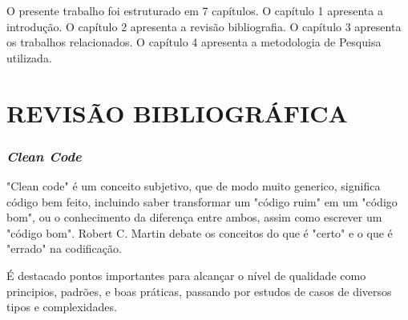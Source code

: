 \documentclass[12pt]{article}
\begin{document}
O presente trabalho foi estruturado em 7 capítulos.
O capítulo 1 apresenta a introdução.
O capítulo 2 apresenta a revisão bibliografia.
O capítulo 3 apresenta os trabalhos relacionados.
O capítulo 4 apresenta a metodologia de Pesquisa utilizada.



\part{REVISÃO BIBLIOGRÁFICA} \label{sec:revisaobibliografica}

\section{\textit{Clean Code}} \label{sec:cleancode}


"Clean code" \cite{ROBERT_MARTIN_CLEAN_CODE} é um conceito subjetivo, que de modo muito generico, significa código bem feito, incluindo saber transformar um "código ruim" em um "código bom", ou o conhecimento da diferença entre ambos, assim como escrever um "código bom". Robert C. Martin \cite{ROBERT_MARTIN_CLEAN_CODE} debate os conceitos do que é "certo" e o que é "errado" na codificação.

É destacado pontos importantes para alcançar o nível de qualidade como principios, padrões, e boas práticas, passando por estudos de casos de diversos tipos e complexidades.
\end{document}

